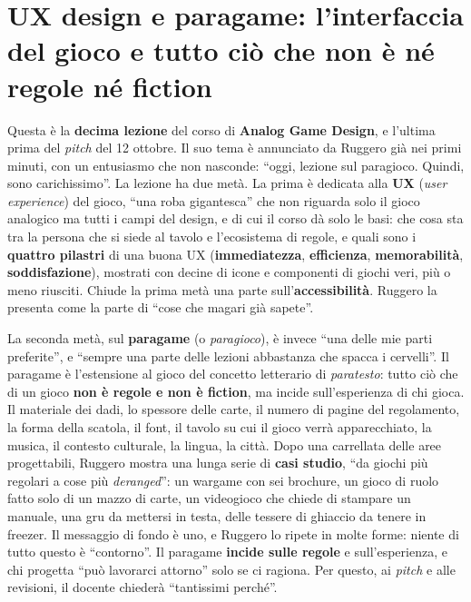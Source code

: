 \chapter[UX design e paragame]{UX design e paragame: l'interfaccia del gioco e
tutto ciò che non è né regole né fiction}
\label{a10:cap:paragame}

Questa è la \textbf{decima lezione} del corso di \textbf{Analog Game Design}, e
l'ultima prima del \emph{pitch} del 12 ottobre. Il suo tema è annunciato da Ruggero
già nei primi minuti, con un entusiasmo che non nasconde: ``oggi, lezione sul
paragioco. Quindi, sono carichissimo''. La lezione ha due metà. La prima è dedicata
alla \textbf{UX} (\emph{user experience}) del gioco, ``una roba gigantesca'' che non
riguarda solo il gioco analogico ma tutti i campi del design, e di cui il corso dà
solo le basi: che cosa sta tra la persona che si siede al tavolo e l'ecosistema di
regole, e quali sono i \textbf{quattro pilastri} di una buona UX
(\textbf{immediatezza}, \textbf{efficienza}, \textbf{memorabilità},
\textbf{soddisfazione}), mostrati con decine di icone e componenti di giochi veri, più
o meno riusciti. Chiude la prima metà una parte sull'\textbf{accessibilità}. Ruggero
la presenta come la parte di ``cose che magari già sapete''.

La seconda metà, sul \textbf{paragame} (o \emph{paragioco}), è invece ``una delle mie
parti preferite'', e ``sempre una parte delle lezioni abbastanza che spacca i
cervelli''. Il paragame è l'estensione al gioco del concetto letterario di
\emph{paratesto}: tutto ciò che di un gioco \textbf{non è regole e non è fiction}, ma
incide sull'esperienza di chi gioca. Il materiale dei dadi, lo spessore delle carte,
il numero di pagine del regolamento, la forma della scatola, il font, il tavolo su cui
il gioco verrà apparecchiato, la musica, il contesto culturale, la lingua, la città.
Dopo una carrellata delle aree progettabili, Ruggero mostra una lunga serie di
\textbf{casi studio}, ``da giochi più regolari a cose più \emph{deranged}'': un
wargame con sei brochure, un gioco di ruolo fatto solo di un mazzo di carte, un
videogioco che chiede di stampare un manuale, una gru da mettersi in testa, delle
tessere di ghiaccio da tenere in freezer. Il messaggio di fondo è uno, e Ruggero lo
ripete in molte forme: niente di tutto questo è ``contorno''. Il paragame
\textbf{incide sulle regole} e sull'esperienza, e chi progetta ``può lavorarci
attorno'' solo se ci ragiona. Per questo, ai \emph{pitch} e alle revisioni, il
docente chiederà ``tantissimi perché''.

